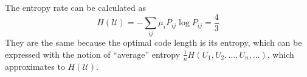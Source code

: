 \begin{exercise}
\begin{solution}
\begin{equation}
    \end{equation}
    The entropy rate can be calculated as
    \begin{equation}
      H(\mathcal{U})=-\sum_{i j} \mu_{i} P_{i j} \log P_{i j} = \frac{4}{3}
    \end{equation}
    They are the same because the optimal code length is its entropy, which can be expressed with the notion of ``average'' entropy $\frac{1}{n} H(U_1,U_2,\ldots,U_n,\ldots)$, which approximates to $H(\mathcal{U})$.
  \end{solution}
  \label{ex7}
\end{exercise}

